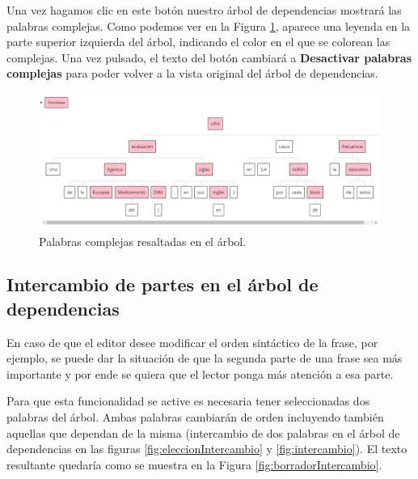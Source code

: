 Una vez hagamos clic en este botón nuestro árbol de dependencias mostrará las palabras complejas. Como podemos ver en la Figura \ref{fig:palabrasComplejas}, aparece una leyenda en la parte superior izquierda del árbol, indicando el color en el que se colorean las complejas. Una vez pulsado, el texto del botón cambiará a \textbf{Desactivar palabras complejas} para poder volver a la vista original del árbol de dependencias. 
	 \begin{figure}[h!]
	\centering
	
	
	\includegraphics[scale=0.6]{Imagenes/Figuras/palabrasComplejas}
	
	
	\caption{Palabras complejas resaltadas en el árbol.}
	\label{fig:palabrasComplejas}
\end{figure}
\subsection{Intercambio de partes en el árbol de dependencias}
En caso de que el editor desee modificar el orden sintáctico de la frase, por ejemplo, se puede dar la situación de que la segunda parte de una frase sea más importante y por ende se quiera que el lector ponga más atención a esa parte. 

Para que esta funcionalidad se active es necesaria tener seleccionadas dos palabras del árbol. Ambas palabras cambiarán de orden incluyendo también aquellas que dependan de la misma (intercambio de dos palabras en el árbol de dependencias en las figuras \ref{fig:eleccionIntercambio} y \ref{fig:intercambio}). El texto resultante quedaría como se muestra en la Figura \ref{fig:borradorIntercambio}. 

